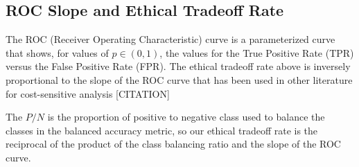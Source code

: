 \subsection{ROC Slope and Ethical Tradeoff Rate}

The ROC (Receiver Operating Characteristic) curve is a parameterized curve that shows, for values of $p \in (0,1)$, the values for the True Positive Rate (TPR) versus the False Positive Rate (FPR).  The ethical tradeoff rate above is inversely proportional to the slope of the ROC curve that has been used in other literature for cost-sensitive analysis [CITATION]

\begin{center}
\end{center}

The $P/N$ is the proportion of positive to negative class used to balance the classes in the balanced accuracy metric, so our ethical tradeoff rate is the reciprocal of the product of the class balancing ratio and the slope of the ROC curve.